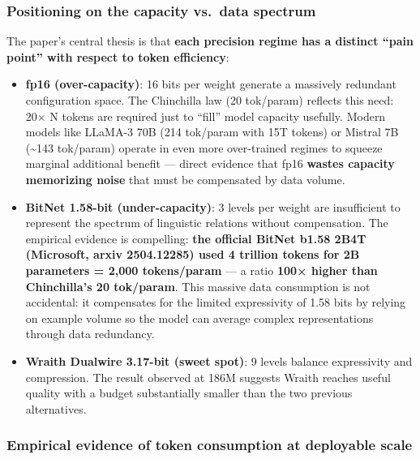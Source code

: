 \subsubsection{Positioning on the capacity vs.~data
spectrum}\label{positioning-on-the-capacity-vs.-data-spectrum}

The paper's central thesis is that \textbf{each precision regime has a
distinct ``pain point'' with respect to token efficiency}:

\begin{itemize}
\item
  \textbf{fp16 (over-capacity)}: 16 bits per weight generate a massively
  redundant configuration space. The Chinchilla law (20 tok/param)
  reflects this need: 20× N tokens are required just to ``fill'' model
  capacity usefully. Modern models like LLaMA-3 70B (214 tok/param with
  15T tokens) or Mistral 7B (\textasciitilde143 tok/param) operate in
  even more over-trained regimes to squeeze marginal additional benefit
  --- direct evidence that fp16 \textbf{wastes capacity memorizing
  noise} that must be compensated by data volume.
\item
  \textbf{BitNet 1.58-bit (under-capacity)}: 3 levels per weight are
  insufficient to represent the spectrum of linguistic relations without
  compensation. The empirical evidence is compelling: \textbf{the
  official BitNet b1.58 2B4T (Microsoft, arxiv 2504.12285) used 4
  trillion tokens for 2B parameters = 2,000 tokens/param} --- a ratio
  \textbf{100× higher than Chinchilla's 20 tok/param}. This massive data
  consumption is not accidental: it compensates for the limited
  expressivity of 1.58 bits by relying on example volume so the model
  can average complex representations through data redundancy.
\item
  \textbf{Wraith Dualwire 3.17-bit (sweet spot)}: 9 levels balance
  expressivity and compression. The result observed at 186M suggests
  Wraith reaches useful quality with a budget substantially smaller than
  the two previous alternatives.
\end{itemize}

\subsubsection{Empirical evidence of token consumption at deployable
scale}\label{empirical-evidence-of-token-consumption-at-deployable-scale}

